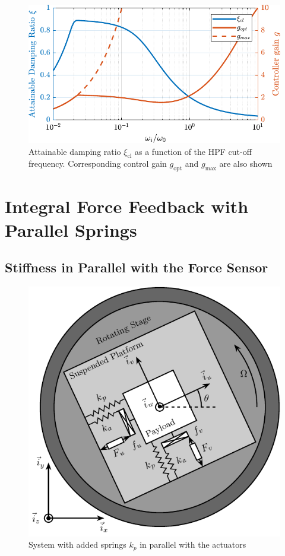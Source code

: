 \documentclass{ISMA_USD2020}
\begin{document}
\begin{figure}[htbp]
\centering
\includegraphics[scale=1]{figs/mod_iff_damping_wi.pdf}
\caption{\label{fig:mod_iff_damping_wi}Attainable damping ratio \(\xi_\text{cl}\) as a function of the HPF cut-off frequency. Corresponding control gain \(g_\text{opt}\) and \(g_\text{max}\) are also shown}
\end{figure}

\section{Integral Force Feedback with Parallel Springs}
\label{sec:org90ec20f}
\subsection{Stiffness in Parallel with the Force Sensor}
\label{sec:org60d6640}

\begin{figure}[htbp]
\centering
\includegraphics[scale=1]{figs/system_parallel_springs.pdf}
\caption{\label{fig:system_parallel_springs}System with added springs \(k_p\) in parallel with the actuators}
\end{figure}
\end{document}
